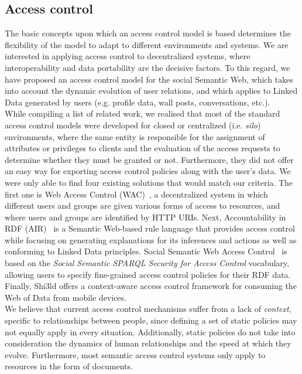 \subsection{Access control}
The basic concepts upon which an access control model is based determines the flexibility of the model to adapt to different environments and systems. We are interested in applying access control to decentralized systems, where interoperability and data portability are the decisive factors. To this regard, we have proposed an access control model for the social Semantic Web, which takes into account the dynamic evolution of user relations, and which applies to Linked Data generated by users (e.g. profile data, wall posts, conversations, etc.).\\

While compiling a list of related work, we realised that most of the standard access control models were developed for closed or centralized (i.e. \textit{silo}) environments, where the same entity is responsible for the assignment of attributes or privileges to clients and the evaluation of the access requests to determine whether they must be granted or not. Furthermore, they did not offer an easy way for exporting access control policies along with the user's data. We were only able to find four existing solutions that would match our criteria. The first one is Web Access Control (WAC)~\cite{hollenbach2009using}, a decentralized system in which different users and groups are given various forms of access to resources, and where users and groups are identified by HTTP URIs. Next, Accountability in RDF (AIR)~\cite{kagal2011gasping} is a Semantic Web-based rule language that provides access control while focusing on generating explanations for its inferences and actions as well as conforming to Linked Data principles. Social Semantic Web Access Control~\cite{villata2011social} is based on the \textit{Social Semantic SPARQL Security for Access Control} vocabulary, allowing users to specify fine-grained access control policies for their RDF data. Finally, Shi3ld offers a context-aware access control framework for consuming the Web of Data from mobile devices.\\

We believe that current access control mechanisms suffer from a lack of \textit{context}, specific to relationships between people, since defining a set of static policies may not equally apply in every situation. Additionally, static policies do not take into consideration the dynamics of human relationships and the speed at which they evolve. Furthermore, most semantic access control systems only apply to resources in the form of documents.\\

